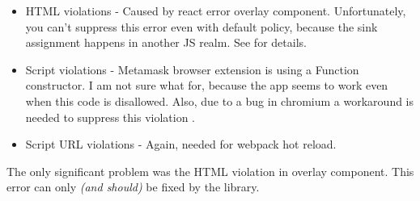 \begin{itemize}
  \item  HTML violations - Caused by react error overlay component. Unfortunately, you can't
        suppress this error even with default policy, because the sink assignment happens in another
        JS realm. See \cite{cross_document_vectors} for details.
  \item  Script violations - Metamask browser extension is using a Function constructor. I am not
        sure what for, because the app seems to work even when this code is disallowed. Also, due to
        a bug in chromium a workaround is needed to suppress this violation
        \cite{tt_fn_constructor}.
  \item  Script URL violations - Again, needed for webpack hot reload.
\end{itemize}

The only significant problem was the HTML violation in overlay component. This error can only
\emph{(and should)} be fixed by the library.
